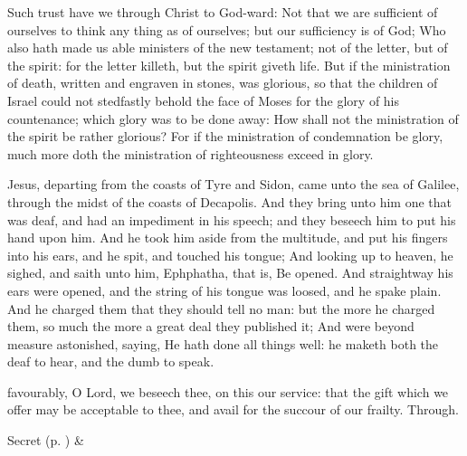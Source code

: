  Such trust have we through Christ to God-ward: Not that we are sufficient of ourselves to think any thing as of ourselves; but our sufficiency is of God; Who also hath made us able ministers of the new testament; not of the letter, but of the spirit: for the letter killeth, but the spirit giveth life. But if the ministration of death, written and engraven in stones, was glorious, so that the children of Israel could not stedfastly behold the face of Moses for the glory of his countenance; which glory was to be done away: How shall not the ministration of the spirit be rather glorious? For if the ministration of condemnation be glory, much more doth the ministration of righteousness exceed in glory.


 Jesus, departing from the coasts of Tyre and Sidon, came unto the sea of Galilee, through the midst of the coasts of Decapolis. And they bring unto him one that was deaf, and had an impediment in his speech; and they beseech him to put his hand upon him. And he took him aside from the multitude, and put his fingers into his ears, and he spit, and touched his tongue; And looking up to heaven, he sighed, and saith unto him, Ephphatha, that is, Be opened. And straightway his ears were opened, and the string of his tongue was loosed, and he spake plain. And he charged them that they should tell no man: but the more he charged them, so much the more a great deal they published it; And were beyond measure astonished, saying, He hath done all things well: he maketh both the deaf to hear, and the dumb to speak.


\secret
{} favourably, O Lord, we beseech thee, on this our service: that the gift which we offer may be acceptable to thee, and avail for the succour of our frailty. Through.
\begin{rubric}
     Secret  (p. \pageref{SPSaints}) \&  
\end{rubric}

